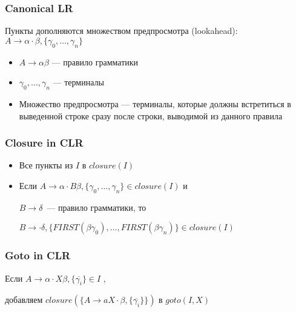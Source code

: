 \documentclass{beamer}
\newcommand{\clritem}[4]{#1 \to #2 \cdot #3, \{#4\}}
\begin{document}
\begin{frame}[fragile]
  \transwipe[direction=90]
  \frametitle{Canonical LR}

\begin{center}
  Пункты дополняются множеством предпросмотра (lookahead): $\clritem{A}{\alpha}{\beta}{\gamma_0, \dots, \gamma_n}$
\end{center}

\begin{itemize}
  \item $A \to \alpha \beta$ --- правило грамматики
  \item $\gamma_0, \dots, \gamma_n$ --- терминалы
  \item Множество предпросмотра --- терминалы, которые должны встретиться в выведенной строке сразу после строки, выводимой из данного правила
\end{itemize}
\end{frame}

\begin{frame}[fragile]
  \transwipe[direction=90]
  \frametitle{Closure in CLR}
  \begin{itemize}
    \item Все пункты из $I$ в $closure(I)$
    \item Если $\clritem{A}{\alpha}{B \beta}{\gamma_0, \dots, \gamma_n} \in closure(I)$ и

    $B \to \delta$~--- правило грамматики, то

    $\clritem{B}{}{\delta}{FIRST(\beta \gamma_0), \dots, FIRST(\beta \gamma_n)} \in closure(I)$
  \end{itemize}
\end{frame}

\begin{frame}[fragile]
  \transwipe[direction=90]
  \frametitle{Goto in CLR}
  \begin{center}
    Если $\clritem{A}{\alpha}{X \beta}{\overline{\gamma_i}} \in I$ ,

    добавляем $closure(\{ \clritem{A}{aX}{\beta}{\overline{\gamma_i}} \})$ в $goto(I, X)$
  \end{center}
\end{frame}
\end{document}

